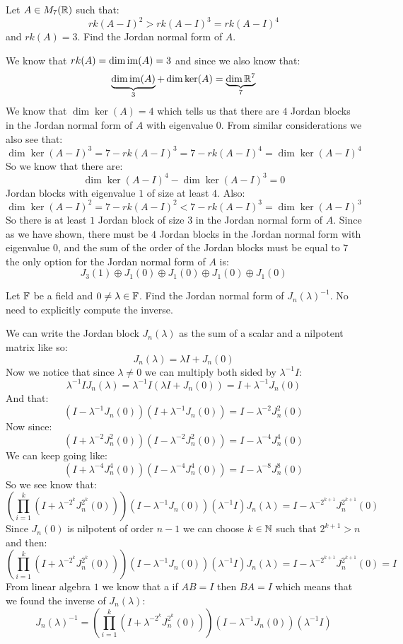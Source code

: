 \documentclass[11pt, a4paper]{article}
\begin{document}
\begin{exercise}
  Let $A\in M_7(\mathbb{R})$ such that:
  \[
    rk(A-I)^2 > rk(A-I)^3 = rk(A-I)^4
  \] and $rk(A)=3$.
  Find the Jordan normal form of $A$.
\end{exercise}
\begin{solution}
We know that $rk(A)=\dim\operatorname{im}(A) = 3$ and since we also know that:
\[
  \underbrace{\dim\operatorname{im}(A)}_3 + \dim\ker(A) = \underbrace{\dim \mathbb{R}^7}_7
\]
We know that $\dim\ker(A) = 4$ which tells us that there are $4$ Jordan blocks
in the Jordan normal form of $A$ with eigenvalue $0$. From similar 
considerations we also see that:
\[
  \dim\ker(A-I)^3 = 7 - rk(A-I)^3 = 7 - rk(A-I)^4 = \dim\ker(A-I)^4
\]
So we know that there are:
\[ \dim\ker(A-I)^4 - \dim\ker(A-I)^3 = 0 \]
Jordan blocks with eigenvalue $1$ of size at least $4$. Also:
\[
  \dim\ker(A-I)^2 = 7 - rk(A-I)^2 < 7 - rk(A-I)^3 = \dim\ker(A-I)^3
\]
So there is at least $1$ Jordan block of size $3$ in the Jordan normal form 
of $A$. Since as we have shown, there must be $4$ Jordan blocks in the Jordan
normal form with eigenvalue $0$, and the sum of the order of the Jordan blocks
must be equal to $7$ the only option for the Jordan normal form of $A$ is:
\[
  J_3(1) \oplus J_1(0) \oplus J_1(0) \oplus J_1(0) \oplus J_1(0)
\]  
\end{solution}

\begin{exercise}
  Let $\mathbb{F}$ be a field and $0\neq\lambda\in\mathbb{F}$. Find the Jordan 
  normal form of $J_n(\lambda)^{-1}$.
  No need to explicitly compute the inverse.
\end{exercise}
\begin{solution}
We can write the Jordan block $J_n(\lambda)$ as the sum of a scalar and
a nilpotent matrix like so:
\[
  J_n(\lambda) = \lambda I + J_n(0)
\]
Now we notice that since $\lambda \neq 0$ we can multiply both sided by 
$\lambda^{-1} I$:
\[
  \lambda^{-1} I J_n(\lambda) =\lambda^{-1} I(\lambda I + J_n(0)) = 
  I + \lambda^{-1}J_n(0)
\]
And that:
\[
  (I - \lambda^{-1}J_n(0))(I + \lambda^{-1}J_n(0)) = 
  I - \lambda^{-2}J_n^2(0)
\]
Now since:
\[
  (I + \lambda^{-2}J_n^2(0))(I - \lambda^{-2}J_n^2(0)) = 
  I - \lambda^{-4}J_n^4(0)
\]
We can keep going like:
\[
  (I + \lambda^{-4}J_n^4(0))(I - \lambda^{-4}J_n^4(0)) = 
  I - \lambda^{-8}J_n^8(0)
\]
So we see know that:
\[
  \left(\prod_{i=1}^{k}{(I + \lambda^{-2^k}J_n^{2^k}(0))}\right)
  (I - \lambda^{-1}J_n(0))(\lambda^{-1} I)J_n(\lambda) = I - \lambda^{-2^{k+1}}
  J_n^{2^{k+1}}(0)
\]
Since $J_n(0)$ is nilpotent of order $n-1$ we can choose $k\in\mathbb{N}$ such that
$2^{k+1} > n$ and then:
\[
  \left(\prod_{i=1}^{k}{(I + \lambda^{-2^k}J_n^{2^k}(0))}\right)
  (I - \lambda^{-1}J_n(0))(\lambda^{-1} I)J_n(\lambda) = I - \lambda^{-2^{k+1}}
  J_n^{2^{k+1}}(0) = I
\]
From linear algebra $1$ we know that a if $AB=I$ then $BA=I$ which means
that we found the inverse of $J_n(\lambda)$:
\[
  J_n(\lambda)^{-1} = 
  \left(\prod_{i=1}^{k}{(I + \lambda^{-2^k}J_n^{2^k}(0))}
  \right)(I - \lambda^{-1}J_n(0))(\lambda^{-1} I)
\]
\end{solution}
\end{document}
